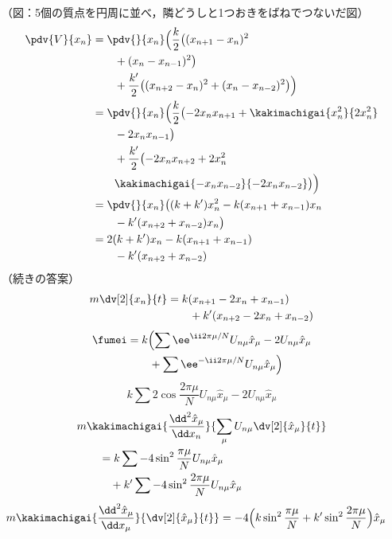 （図：5個の質点を円周に並べ，隣どうしと1つおきをばねでつないだ図）
\begin{align*}
  \pdv{V}{x_n}&=\pdv{}{x_n}\Bigl(\frac{k}{2}\bigl((x_{n+1}-x_n)^{2}\\
  &\qquad+(x_n-x_{n-1})^{2}\bigr)\\
  &\qquad+\frac{k'}{2}\bigl((x_{n+2}-x_n)^{2}+(x_n-x_{n-2})^{2}\bigr)\Bigr)\\
  &=\pdv{}{x_n}\Bigl(\frac{k}{2}\bigl(-2x_nx_{n+1}+\kakimachigai{x_n^{2}}{2x_n^{2}}\\
  &\qquad-2x_nx_{n-1}\bigr)\\
  &\qquad+\frac{k'}{2}\bigl(-2x_nx_{n+2}+2x_n^{2}\\
  &\qquad\kakimachigai{-x_nx_{n-2}}{-2x_nx_{n-2}}\bigr)\Bigr)\\
  &=\pdv{}{x_n}\bigl((k+k')x_n^{2}-k(x_{n+1}+x_{n-1})x_n\\
  &\qquad-k'(x_{n+2}+x_{n-2})x_n\bigr)\\
  &=2(k+k')x_n-k(x_{n+1}+x_{n-1})\\
  &\qquad-k'(x_{n+2}+x_{n-2})
\end{align*}
（続きの答案）
\begin{align*}
  m\dv[2]{x_n}{t}&=k(x_{n+1}-2x_n+x_{n-1})\\
  &\qquad+k'(x_{n+2}-2x_n+x_{n-2})
\end{align*}
\mikai
{}
\begin{align*}
  \fumei&=k\Bigl(\sum\ee^{\ii2\pi\mu/N}U_{n\mu}\hat{x}_{\mu}-2U_{n\mu}\hat{x}_{\mu}\\
  &\qquad+\sum\ee^{-\ii2\pi\mu/N}U_{n\mu}\hat{x}_{\mu}\Bigr)
\end{align*}
\[
  k\sum2\cos\frac{2\pi\mu}{N}U_{n\mu}\hat{x}_{\mu}-2U_{n\mu}\hat{x}_{\mu}
\]
\begin{align*}
  &m\kakimachigai{\frac{\dd^{2}\hat{x}_{\mu}}{\dd x_n}}{\sum_{\mu}U_{n\mu}\dv[2]{\hat{x}_{\mu}}{t}}\\
  &\qquad=k\sum-4\sin^{2}\frac{\pi\mu}{N}U_{n\mu}\hat{x}_{\mu}\\
  &\qquad\quad+k'\sum-4\sin^{2}\frac{2\pi\mu}{N}U_{n\mu}\hat{x}_{\mu}
\end{align*}
\begin{align*}
  m\kakimachigai{\frac{\dd^{2}\hat{x}_{\mu}}{\dd x_{\mu}}}{\dv[2]{\hat{x}_{\mu}}{t}}&=-4\Bigl(k\sin^{2}\frac{\pi\mu}{N}+k'\sin^{2}\frac{2\pi\mu}{N}\Bigr)\hat{x}_{\mu}
\end{align*}
